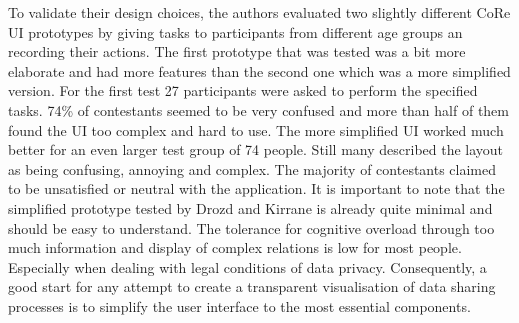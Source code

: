   To validate their design choices, the authors evaluated two slightly different CoRe UI prototypes by giving tasks to participants from different age groups an recording their actions. The first prototype that was tested was a bit more elaborate and had more features than the second one which was a more simplified version. For the first test 27 participants were asked to perform the specified tasks. 74\% of contestants seemed to be very confused and more than half of them found the UI too complex and hard to use. The more simplified UI worked much better for an even larger test group of 74 people. Still many described the layout as being confusing, annoying and complex. The majority of contestants claimed to be unsatisfied or neutral with the application.
  It is important to note that the simplified prototype tested by Drozd and Kirrane is already quite minimal and should be easy to understand. The tolerance for cognitive overload through too much information and display of complex relations is low for most people. Especially when dealing with legal conditions of data privacy. Consequently, a good start for any attempt to create a transparent visualisation of data sharing processes is to simplify the user interface to the most essential components. 

